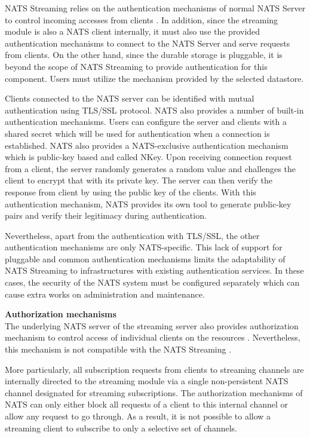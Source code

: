 NATS Streaming relies on the authentication mechanisms of normal NATS Server to control incoming accesses from clients \cite{normalnatsconfig}. In addition, since the streaming module is also a NATS client internally, it must also use the provided authentication mechanisms to connect to the NATS Server and serve requests from clients. On the other hand, since the durable storage is pluggable, it is beyond the scope of NATS Streaming to provide authentication for this component. Users must utilize the mechanism provided by the selected datastore.

Clients connected to the NATS server can be identified with mutual authentication using TLS/SSL protocol. NATS also provides a number of built-in authentication mechanisms. Users can configure the server and clients with a shared secret which will be used for authentication when a connection is established. NATS also provides a NATS-exclusive authentication mechanism which is public-key based and called NKey. Upon receiving connection request from a client, the server randomly generates a random value and challenges the client to encrypt that with its private key. The server can then verify the response from client by using the public key of the clients. With this authentication mechanism, NATS provides its own tool to generate public-key pairs and verify their legitimacy during authentication.

Nevertheless, apart from the authentication with TLS/SSL, the other authentication mechanisms are only NATS-specific. This lack of support for pluggable and common authentication mechanisms limits the adaptability of NATS Streaming to infrastructures with existing authentication services. In these cases, the security of the NATS system must be configured separately which can cause extra works on administration and maintenance.

\textbf{Authorization mechanisms}\\
The underlying NATS server of the streaming server also provides authorization mechanism to control access of individual clients on the resources \cite{normalnatsconfig}. Nevertheless, this mechanism is not compatible with the NATS Streaming \cite{natsauthorization}. 

More particularly, all subscription requests from clients to streaming channels are internally directed to the streaming module via a single non-persistent NATS channel designated for streaming subscriptions. The authorization mechanisms of NATS can only either block all requests of a client to this internal channel or allow any request to go through. As a result, it is not possible to allow a streaming client to subscribe to only a selective set of channels. 

